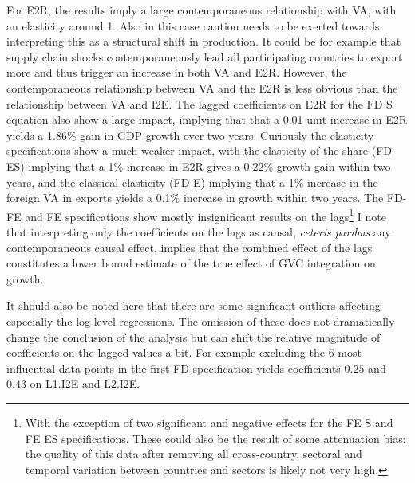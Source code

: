 \documentclass[a4paper]{article}
\begin{document}
For E2R, the results imply a large contemporaneous relationship with VA, with an elasticity around 1. Also in this case caution needs to be exerted towards interpreting this as a structural shift in production. It could be for example that supply chain shocks contemporaneously lead all participating countries to export more and thus trigger an increase in both VA and E2R. However, the contemporaneous relationship between VA and the E2R is less obvious than the relationship between VA and I2E. The lagged coefficients on E2R for the FD S equation also show a large impact, implying that that a 0.01 unit increase in E2R yields a 1.86\% gain in GDP growth over two years. Curiously the elasticity specifications show a much weaker impact, with the elasticity of the share (FD-ES) implying that a 1\% increase in E2R gives a 0.22\% growth gain within two years, and the classical elasticity (FD E) implying that a 1\% increase in the foreign VA in exports yields a 0.1\% increase in growth within two years. The FD-FE and FE specifications show mostly insignificant results on the lags\footnote{With the exception of two significant and negative effects for the FE S and FE ES specifications. These could also be the result of some attenuation bias; the quality of this data after removing all cross-country, sectoral and temporal variation between countries and sectors is likely not very high.}  I note that interpreting only the coefficients on the lags as causal, \textit{ceteris paribus} any contemporaneous causal effect, implies that the combined effect of the lags constitutes a lower bound estimate of the true effect of GVC integration on growth.  \newline

It should also be noted here that there are some significant outliers affecting especially the log-level regressions. The omission of these does not dramatically change the conclusion of the analysis but can shift the relative magnitude of coefficients on the lagged values a bit. For example excluding the 6 most influential data points in the first FD specification yields coefficients $0.25$ and $0.43$ on L1.I2E and L2.I2E. \newline 
\end{document}
